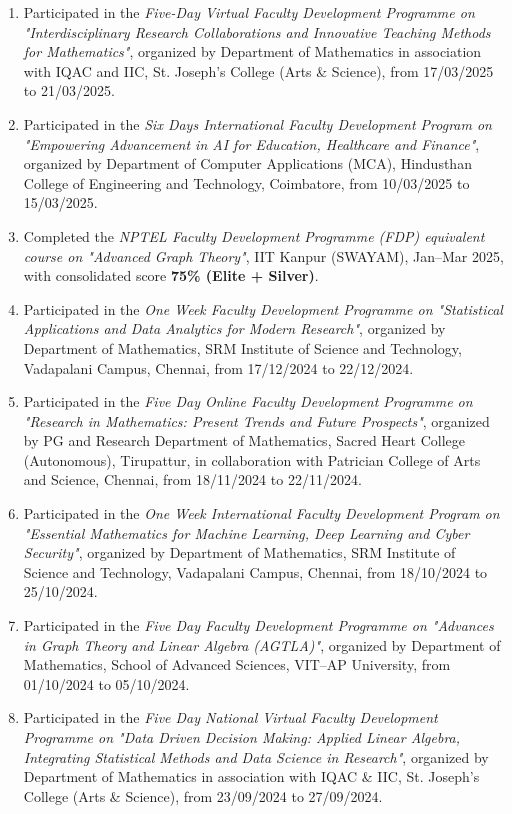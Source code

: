 \begin{enumerate}[label=\protect\circled{\arabic*}, leftmargin=*, itemsep=1ex]
\item Participated in the \emph{Five-Day Virtual Faculty Development Programme on "Interdisciplinary Research Collaborations and Innovative Teaching Methods for Mathematics"}, organized by Department of Mathematics in association with IQAC and IIC, St. Joseph's College (Arts \& Science), from 17/03/2025 to 21/03/2025.

\item Participated in the \emph{Six Days International Faculty Development Program on "Empowering Advancement in AI for Education, Healthcare and Finance"}, organized by Department of Computer Applications (MCA), Hindusthan College of Engineering and Technology, Coimbatore, from 10/03/2025 to 15/03/2025.

\item Completed the \emph{NPTEL Faculty Development Programme (FDP) equivalent course on "Advanced Graph Theory"}, IIT Kanpur (SWAYAM), Jan--Mar 2025, with consolidated score \textbf{75\% (Elite + Silver)}.

\item Participated in the \emph{One Week Faculty Development Programme on "Statistical Applications and Data Analytics for Modern Research"}, organized by Department of Mathematics, SRM Institute of Science and Technology, Vadapalani Campus, Chennai, from 17/12/2024 to 22/12/2024.

\item Participated in the \emph{Five Day Online Faculty Development Programme on "Research in Mathematics: Present Trends and Future Prospects"}, organized by PG and Research Department of Mathematics, Sacred Heart College (Autonomous), Tirupattur, in collaboration with Patrician College of Arts and Science, Chennai, from 18/11/2024 to 22/11/2024.

\item Participated in the \emph{One Week International Faculty Development Program on "Essential Mathematics for Machine Learning, Deep Learning and Cyber Security"}, organized by Department of Mathematics, SRM Institute of Science and Technology, Vadapalani Campus, Chennai, from 18/10/2024 to 25/10/2024.

\item Participated in the \emph{Five Day Faculty Development Programme on "Advances in Graph Theory and Linear Algebra (AGTLA)"}, organized by Department of Mathematics, School of Advanced Sciences, VIT--AP University, from 01/10/2024 to 05/10/2024.

\item Participated in the \emph{Five Day National Virtual Faculty Development Programme on "Data Driven Decision Making: Applied Linear Algebra, Integrating Statistical Methods and Data Science in Research"}, organized by Department of Mathematics in association with IQAC \& IIC, St. Joseph's College (Arts \& Science), from 23/09/2024 to 27/09/2024.


\end{enumerate}
